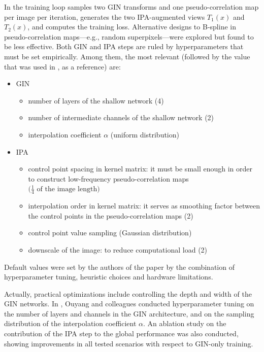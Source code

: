 In \cite{Ouyang2023} the training loop samples two GIN transforms and one pseudo-correlation map per image per iteration, generates the two IPA-augmented views $T_1(x)$ and $T_2(x)$, and computes the training loss. Alternative designs to B-spline in pseudo-correlation maps---e.g., random superpixels---were explored but found to be less effective. Both GIN and IPA steps are ruled by hyperparameters that must be set empirically. Among them, the most relevant (followed by the value that was used in \cite{Ouyang2023}, as a reference) are:
\begin{itemize}
    \item GIN
    \begin{itemize}
        \item number of layers of the shallow network (4)
        \item number of intermediate channels of the shallow network (2)
        \item interpolation coefficient $\alpha$ (uniform distribution)
    \end{itemize}
    \item IPA
    \begin{itemize}
        \item control point spacing in kernel matrix: it must be small enough in order to construct low-frequency pseudo-correlation maps $\bigl(\frac{1}{4}\textrm{ of the image length}\bigr)$
        \item interpolation order in kernel matrix: it serves as smoothing factor between the control points in the pseudo-correlation maps (2)
        \item control point value sampling (Gaussian distribution)
        \item downscale of the image: to reduce computational load (2)
    \end{itemize}
\end{itemize}
Default values were set by the authors of the paper by the combination of hyperparameter tuning, heuristic choices and hardware limitations.

Actually, practical optimizations include controlling the depth and width of the GIN networks. In \cite{Ouyang2023}, Ouyang and colleagues conducted hyperparameter tuning on the number of layers and channels in the GIN architecture, and on the sampling distribution of the interpolation coefficient $\alpha$. An ablation study on the contribution of the IPA step to the global performance was also conducted, showing improvements in all tested scenarios with respect to GIN-only training.

